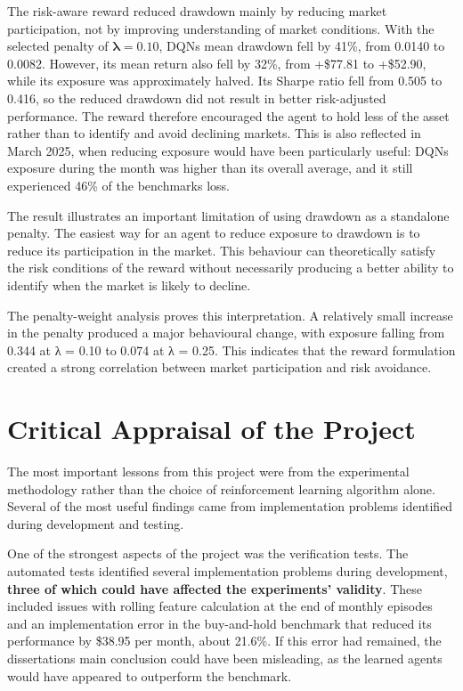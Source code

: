 The risk-aware reward reduced drawdown mainly by reducing market
participation, not by improving understanding of market conditions. With
the selected penalty of \(\symbf{\lambda = 0.10}\),
DQN\textquotesingle s mean drawdown fell by 41\%, from 0.0140 to 0.0082.
However, its mean return also fell by 32\%, from +\$77.81 to +\$52.90,
while its exposure was approximately halved. Its Sharpe ratio fell from
0.505 to 0.416, so the reduced drawdown did not result in better
risk-adjusted performance. The reward therefore encouraged the agent to
hold less of the asset rather than to identify and avoid declining
markets. This is also reflected in March 2025, when reducing exposure
would have been particularly useful: DQN\textquotesingle s exposure
during the month was higher than its overall average, and it still
experienced 46\% of the benchmark\textquotesingle s loss.

The result illustrates an important limitation of using drawdown as a
standalone penalty. The easiest way for an agent to reduce exposure to
drawdown is to reduce its participation in the market. This behaviour
can theoretically satisfy the risk conditions of the reward without
necessarily producing a better ability to identify when the market is
likely to decline.

The penalty-weight analysis proves this interpretation. A relatively
small increase in the penalty produced a major behavioural change, with
exposure falling from 0.344 at λ = 0.10 to 0.074 at λ = 0.25. This
indicates that the reward formulation created a strong correlation
between market participation and risk avoidance.

\section{Critical Appraisal of the Project}

The most important lessons from this project were from the experimental
methodology rather than the choice of reinforcement learning algorithm
alone. Several of the most useful findings came from implementation
problems identified during development and testing.

One of the strongest aspects of the project was the verification tests.
The automated tests identified several implementation problems during
development, \textbf{three of which could have affected the
experiments' validity}. These
included issues with rolling feature calculation at the end of monthly
episodes and an implementation error in the buy-and-hold benchmark that
reduced its performance by \$38.95 per month, about 21.6\%. If this
error had remained, the dissertation\textquotesingle s main conclusion
could have been misleading, as the learned agents would have appeared to
outperform the benchmark.

